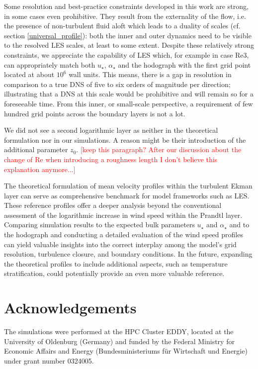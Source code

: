 \documentclass[a4paper,11pt]{article}
\newcommand{\todo}[1]{\textcolor{red}{$[$#1$]$}}
\begin{document}
Some resolution and best-practice constraints developed in this work are strong, in some cases even prohibitive. They result from the externality of the flow, i.e. the presence of non-turbulent fluid aloft which leads to a duality of scales (cf. section \ref{universal_profile}): both the inner and outer dynamics need to be visible to the resolved LES scales, at least to some extent. Despite these relatively strong constraints, we appreciate the capability of LES which, for example in case Re3, can appropriately match both $u_\star$, $\alpha_\star$ and the hodograph with the first grid point located at about $10^6$ wall units. This means, there is a gap in resolution in comparison to a true DNS of five to six orders of magnitude per direction; illustrating that a DNS at this scale would be prohibitive and will remain so for a foreseeable time. From this inner, or small-scale perspective, a requirement of few hundred grid points across the boundary layers is not a lot.

We did not see a second logarithmic layer as \cite{jiang2018large} neither in the theoretical formulation nor in our simulations. A reason might be their introduction of the additional parameter $z_0$. \todo{keep this paragraph? After our discussion about the change of Re when introducing a roughness length I don't believe this explanation anymore...}

The theoretical formulation of mean velocity profiles within the turbulent Ekman layer can serve as comprehensive benchmark for model frameworks such as LES. These reference profiles offer a deeper analysis beyond the conventional assessment of the logarithmic increase in wind speed within the Prandtl layer. Comparing simulation results to the expected bulk parameters $u_\star$ and $\alpha_\star$ and to the hodograph and conducting a detailed evaluation of the wind speed profiles can yield valuable insights into the correct interplay among the model's grid resolution, turbulence closure, and boundary conditions. In the future, expanding the theoretical profiles to include additional aspects, such as temperature stratification, could potentially provide an even more valuable reference.

\section{Acknowledgements}

The simulations were performed at the HPC Cluster EDDY, located at the University of Oldenburg (Germany) and funded by the Federal Ministry for Economic Affairs and Energy (Bundesministeriums für Wirtschaft und Energie) under grant number 0324005.



\end{document}
